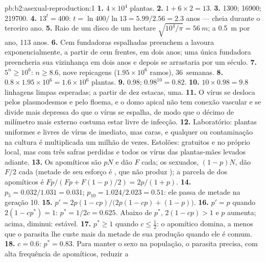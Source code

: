 \begin{solution}{pb:b2:asexual-reproduction:1}
\textbf{1.} $4\times 10^{4}$ plantas.
\textbf{2.} $1 + 6\times 2 = 13$.
\textbf{3.} \num{1300}; \num{16900}; \num{219700}.
\textbf{4.} $13^{t} = 400$: $t = \ln 400/\ln 13 = 5.99/2.56 = 2.3$
anos --- cheia durante o terceiro ano.
\textbf{5.} Raio de um disco de um hectare
$\sqrt{10^{4}/\pi} = \qty{56}{m}$; a \qty{0.5}{m} por ano, \num{113} anos.
\textbf{6.} Cem fundadoras espalhadas preenchem a lavoura
exponencialmente, a partir de cem frentes, em dois anos; uma única
fundadora preencheria sua vizinhança em dois anos e depois se
arrastaria por um século.
\textbf{7.} $5^{n} \ge 10^{6}$: $n \ge 8.6$, nove repicagens
($1.95\times 10^{6}$ ramos), 36~semanas.
\textbf{8.} $0.8\times 1.95\times 10^{6} = 1.6\times 10^{6}$ plantas.
\textbf{9.} $0.98$; $0.98^{10} = 0.82$.
\textbf{10.} $10\times 0.98 = 9.8$ linhagens limpas esperadas; a
partir de dez estacas, uma.
\textbf{11.} O vírus se desloca pelos plasmodesmos e pelo floema, e o
domo apical não tem conexão vascular e se divide mais depressa do que
o vírus se espalha, de modo que o décimo de milímetro mais externo
costuma estar livre de infecção.
\textbf{12.} Laboratório: plantas uniformes e livres de vírus de
imediato, mas caras, e qualquer  ou contaminação na cultura é
multiplicada um milhão de vezes. Estolões: gratuitos e no próprio local,
mas com três safras perdidas e todos os vírus das plantas-mães levados
adiante.
\textbf{13.} Os apomíticos são $pN$ e dão $F$  cada; os
sexuados, $(1 - p)N$, dão $F/2$  cada (metade de seu esforço é
, que não produz ); a parcela de  dos apomíticos é
$Fp/(Fp + F(1 - p)/2)
= 2p/(1 + p)$.
\textbf{14.} $p_5 = 0.032/1.031 = 0.031$; $p_{10} = 1.024/2.023 =
0.51$: ele passa de metade na geração 10.
\textbf{15.} $p' = 2p(1 - cp)/\bigl(2p(1 - cp) + (1 - p)\bigr)$.
\textbf{16.} $p' = p$ quando $2(1 - cp^*) = 1$: $p^* = 1/2c = 0.625$.
Abaixo de $p^*$, $2(1 - cp) > 1$ e $p$ aumenta; acima, diminui:
estável.
\textbf{17.} $p^* \ge 1$ quando $c \le \tfrac12$: o apomítico domina,
a menos que o parasita lhe custe mais da metade de sua produção quando
ele é comum.
\textbf{18.} $c = 0.6$: $p^* = 0.83$. Para manter o sexo na população,
o parasita precisa, com alta frequência de apomíticos, reduzir a

\end{solution}

